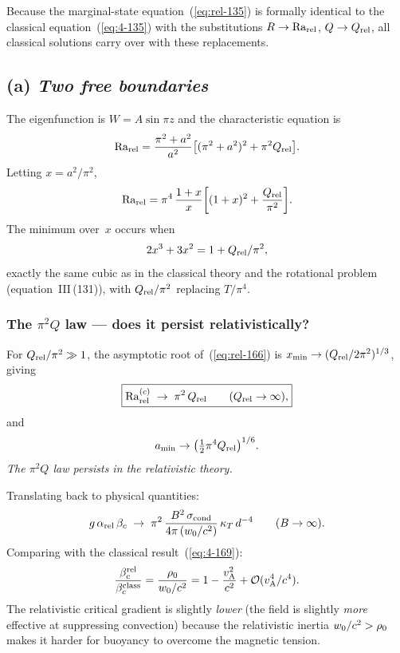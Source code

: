 Because the marginal-state equation~(\ref{eq:rel-135}) is formally
identical to the classical equation~(\ref{eq:4-135}) with the
substitutions $R\to\mathrm{Ra}_{\mathrm{rel}}$, $Q\to Q_{\mathrm{rel}}$, all classical solutions
carry over with these replacements.

\subsection*{(a) \emph{Two free boundaries}}

The eigenfunction is $W=A\sin\pi z$ and the characteristic equation
is
\begin{equation}\label{eq:rel-163}
  \mathrm{Ra}_{\mathrm{rel}}
  = \frac{\pi^{2}+a^{2}}{a^{2}}
    \bigl[(\pi^{2}+a^{2})^{2}+\pi^{2}Q_{\mathrm{rel}}\bigr].
\end{equation}
Letting $x=a^{2}/\pi^{2}$,
\begin{equation}\label{eq:rel-165}
  \mathrm{Ra}_{\mathrm{rel}}
  = \pi^{4}\,\frac{1+x}{x}
    \biggl[(1+x)^{2}+\frac{Q_{\mathrm{rel}}}{\pi^{2}}\biggr].
\end{equation}
The minimum over~$x$ occurs when
\begin{equation}\label{eq:rel-166}
  2x^{3}+3x^{2} = 1+Q_{\mathrm{rel}}/\pi^{2},
\end{equation}
exactly the same cubic as in the classical theory and the
rotational problem (equation~III\,(131)), with
$Q_{\mathrm{rel}}/\pi^{2}$ replacing $T/\pi^{4}$.

\subsubsection*{The $\pi^{2}Q$ law --- does it persist
  relativistically?}

For $Q_{\mathrm{rel}}/\pi^{2}\gg 1$, the asymptotic root of~(\ref{eq:rel-166})
is $x_{\min}\to(Q_{\mathrm{rel}}/2\pi^{2})^{1/3}$, giving
\begin{equation}\label{eq:rel-168}
  \boxed{
  \mathrm{Ra}_{\mathrm{rel}}^{(c)} \;\to\; \pi^{2}\,Q_{\mathrm{rel}}
  \qquad (Q_{\mathrm{rel}}\to\infty),
  }
\end{equation}
and
\begin{equation}\label{eq:rel-168b}
  a_{\min} \to \bigl(\tfrac{1}{2}\pi^{4}Q_{\mathrm{rel}}\bigr)^{1/6}.
\end{equation}
\emph{The $\pi^{2}Q$ law persists in the relativistic theory.}

Translating back to physical quantities:
\begin{equation}\label{eq:rel-169}
  g\,\alpha_{\text{rel}}\,\beta_{c}
  \;\to\;
  \pi^{2}\,\frac{B^{2}\,\sigma_{\text{cond}}}{4\pi\,
    (w_{0}/c^{2})}\,\kappa_{T}\,d^{-4}
  \qquad (B\to\infty).
\end{equation}
Comparing with the classical result~(\ref{eq:4-169}):
\begin{equation}\label{eq:rel-169-compare}
  \frac{\beta_{c}^{\text{rel}}}{\beta_{c}^{\text{class}}}
  = \frac{\rho_0}{w_{0}/c^{2}}
  = 1 - \frac{v_{\mathrm{A}}^{2}}{c^{2}} + \mathcal{O}(v_{\mathrm{A}}^{4}/c^{4}).
\end{equation}
The relativistic critical gradient is slightly \emph{lower} (the
field is slightly \emph{more} effective at suppressing convection)
because the relativistic inertia $w_{0}/c^{2}>\rho_0$
makes it harder for buoyancy to overcome the magnetic tension.

